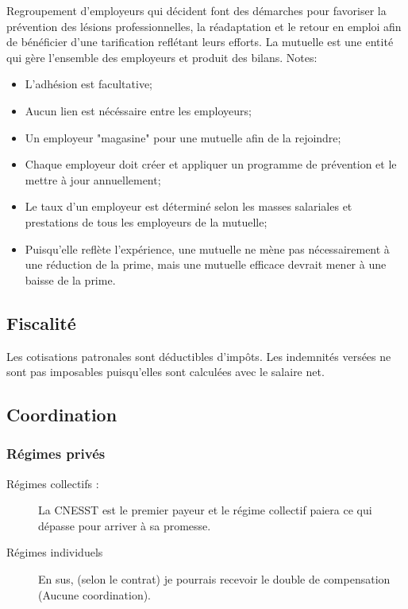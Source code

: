\documentclass[10pt, french]{article}
\begin{document}
\begin{multicols*}{3}
\begin{definitionNOHFILL}
Regroupement d’employeurs qui décident font des démarches pour favoriser la prévention des lésions professionnelles, la réadaptation et le retour en emploi afin de bénéficier d’une tarification reflétant leurs efforts. La mutuelle est une entité qui gère l'ensemble des employeurs et produit des bilans.
\tcbline
Notes:
\begin{itemize}[leftmargin = *]
	\item	L'adhésion est facultative; 
	\item	Aucun lien est nécéssaire entre les employeurs;
	\item	Un employeur "magasine" pour une mutuelle afin de la rejoindre;
	\item	Chaque employeur doit créer et appliquer un programme de prévention et le mettre à jour annuellement;
	\item	Le taux d'un employeur est déterminé selon les masses salariales et prestations de tous les employeurs de la mutuelle;
	\item	Puisqu'elle reflète l'expérience, une mutuelle ne mène pas nécessairement à une réduction de la prime, mais une mutuelle efficace devrait mener à une baisse de la prime.
\end{itemize}
\end{definitionNOHFILL}


\columnbreak
\subsection{Fiscalité}
Les cotisations patronales sont déductibles d'impôts.
Les indemnités versées ne sont pas imposables puisqu'elles sont calculées avec le salaire net.



\columnbreak
\subsection{Coordination}
\subsubsection*{Régimes privés}
\begin{description}
\item[Régimes collectifs :]	La CNESST est le premier payeur et le régime collectif paiera ce qui dépasse pour arriver à sa promesse.
\item[Régimes individuels]	En sus, (selon le contrat) je pourrais recevoir le double de compensation (Aucune coordination).
\end{description}


\end{multicols*}
\end{document}

